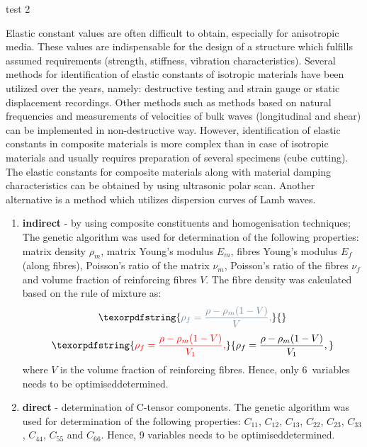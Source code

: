 \documentclass[]{spie}  %
\providecommand{\DIFaddtex}[1]{{\protect\color{red}#1}} %
\providecommand{\DIFdeltex}[1]{{\protect\color{mygrey}\scriptsize{#1}}}                       %
\providecommand{\DIFaddbegin}{} %
\providecommand{\DIFaddend}{} %
\providecommand{\DIFdelbegin}{} %
\providecommand{\DIFdelend}{} %
\providecommand{\DIFadd}[1]{\texorpdfstring{\DIFaddtex{#1}}{#1}} %
\providecommand{\DIFdel}[1]{\texorpdfstring{\DIFdeltex{#1}}{}} %
\newcommand{\DIFscaledelfig}{0.5}
\newlength{\DIFdelgraphicswidth} %
\newlength{\DIFdelgraphicsheight} %
\newcommand{\DIFaddincludegraphics}[2][]{{\color{blue}\fbox{\DIFOincludegraphics[#1]{#2}}}} %
\newcommand{\DIFdelincludegraphics}[2][]{%
\sbox{\DIFdelgraphicsbox}{\DIFOincludegraphics[#1]{#2}}%
\settoboxwidth{\DIFdelgraphicswidth}{\DIFdelgraphicsbox} %
\settoboxtotalheight{\DIFdelgraphicsheight}{\DIFdelgraphicsbox} %
\scalebox{\DIFscaledelfig}{%
\parbox[b]{\DIFdelgraphicswidth}{\usebox{\DIFdelgraphicsbox}\\[-\baselineskip] \rule{\DIFdelgraphicswidth}{0em}}\llap{\resizebox{\DIFdelgraphicswidth}{\DIFdelgraphicsheight}{%
\setlength{\unitlength}{\DIFdelgraphicswidth}%
\begin{picture}(1,1)%
\thicklines\linethickness{2pt} %
{\color[rgb]{1,0,0}\put(0,0){\framebox(1,1){}}}%
{\color[rgb]{1,0,0}\put(0,0){\line( 1,1){1}}}%
{\color[rgb]{1,0,0}\put(0,1){\line(1,-1){1}}}%
\end{picture}%
}\hspace*{3pt}}} %
} %
\DeclareRobustCommand{\DIFaddbegin}{\DIFOaddbegin \let\includegraphics\DIFaddincludegraphics} %
\DeclareRobustCommand{\DIFaddend}{\DIFOaddend \let\includegraphics\DIFOincludegraphics} %
\DeclareRobustCommand{\DIFdelbegin}{\DIFOdelbegin \let\includegraphics\DIFdelincludegraphics} %
\DeclareRobustCommand{\DIFdelend}{\DIFOaddend \let\includegraphics\DIFOincludegraphics} %
\begin{document}
test \DIFaddbegin \DIFadd{2
}\DIFaddend 

Elastic constant values are often difficult to obtain, especially for anisotropic media.
These values are indispensable for the design of a structure which fulfills assumed 
requirements (strength, stiffness, vibration characteristics). 
Several methods for identification of elastic constants of isotropic materials have been 
utilized over the years, namely: destructive testing and strain gauge or static 
displacement recordings. 
Other methods such as methods based on natural frequencies and measurements of 
velocities of bulk waves (longitudinal and shear) can be implemented in non-destructive 
way. 
However, identification of elastic constants in composite materials is more complex 
than in case of isotropic materials and usually requires preparation of several 
specimens (cube cutting).
\DIFaddbegin \DIFadd{The elastic constants for composite materials along with material damping 
characteristics can be obtained by using ultrasonic polar scan.
}\DIFaddend Another alternative is a method which utilizes dispersion 
curves of Lamb waves.

	\begin{enumerate}
	\item \textbf{indirect} - by using composite constituents and homogenisation 
	techniques;
	The genetic algorithm was used for determination of the following properties:  matrix 
	density $\rho_m$, matrix Young's modulus $E_m$, fibres Young's modulus $E_f$ 
	\DIFaddbegin \DIFadd{(along fibres)}\DIFaddend , Poisson's ratio of the matrix $\nu_m$, Poisson's ratio of the fibres 
	$\nu_f$ and volume fraction of reinforcing fibres $V$.  The fibre density was 
	calculated based on the rule of mixture as:
	\DIFdelbegin \begin{displaymath}
	\DIFdel{\rho_f = \frac{\rho - \rho_m (1-V)}{V},
	}\end{displaymath}%
\DIFdelend \DIFaddbegin \begin{equation}
	\DIFadd{\rho_f = \frac{\rho - \rho_m (1-V)}{V_1},
	}\end{equation}\DIFaddend 
	where $V$ is the volume fraction of reinforcing fibres. Hence, only 6~variables needs 
	to be \DIFdelbegin \DIFdel{optimised}\DIFdelend \DIFaddbegin \DIFadd{determined}\DIFaddend .
	\item \textbf{direct} - determination of C-tensor components.
	The genetic algorithm was used for determination of the following properties: 
	$C_{11}$, $C_{12}$, $C_{13}$,  $C_{22}$, $C_{23}$, $C_{33}$, $C_{44}$, $C_{55}$ 
	and $C_{66}$. Hence, 9 variables needs to be \DIFdelbegin \DIFdel{optimised}\DIFdelend \DIFaddbegin \DIFadd{determined}\DIFaddend .
\end{enumerate}
\end{document}

